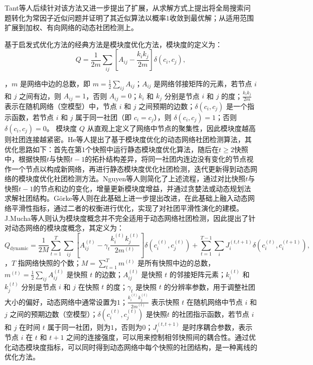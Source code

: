 Tant等人后续针对该方法又进一步提出了扩展，从求解方式上提出将全局搜索问题转化为常因子近似问题并证明了其近似算法以概率$1$收敛到最优解\cite{tantipathananandh2009constant}；从适用范围扩展到加权、有向网络的动态社团检测上\cite{tantipathananandh2011finding}。

基于启发式优化方法的经典方法是模块度优化方法，模块度\cite{newman2004finding}的定义为：
\begin{equation}
	Q = \frac{1}{2m} \sum_{ij} \left[ A_{ij} - \frac{k_i k_j}{2m} \right] \delta(c_i, c_j),
\end{equation}

，\( m \) 是网络中边的总数，即 \( m = \frac{1}{2} \sum_{ij} A_{ij} \)；\( A_{ij} \) 是网络邻接矩阵的元素，若节点 \( i \) 和 \( j \) 之间有边，则 \( A_{ij} = 1 \)，否则 \( A_{ij} = 0 \)；\( k_i \) 和 \( k_j \) 分别是节点 \( i \) 和 \( j \) 的度；\( \frac{k_i k_j}{2m} \) 表示在随机网络（空模型）中，节点 \( i \) 和 \( j \) 之间预期的边数；\( \delta(c_i, c_j) \) 是一个指示函数，若节点 \( i \) 和 \( j \) 属于同一社团（即 \( c_i = c_j \)），则 \( \delta(c_i, c_j) = 1 \)；否则 \( \delta(c_i, c_j) = 0 \)。
模块度 \( Q \) 从直观上定义了网络中节点的聚集性，因此模块度越高则社团连接越紧密。He等人\cite{he2015fast}提出了基于模块度优化的动态网络社团检测算法，其优化思路如下：首先在第\(1\)个快照中运行静态模块度优化算法，随后在$t \ge 2$快照中，根据快照$t$与快照$t-1$的拓扑结构差异，将同一社团内连边没有变化的节点视作一个节点以构成新网络，再进行静态模块度优化社团检测，迭代更新得到动态网络的模块度优化社团检测方法。Nguyen等人\cite{nguyen2011adaptive}则简化了上述流程，通过对比快照$t$与快照$t-1$的节点和边的变化，增量更新模块度增益，并通过贪婪法或动态规划法求解社团结构。G{\"o}rke等人\cite{gorke2013dynamic}则在此基础上进一步提出改进，在此基础上融入动态网络平滑性指标，通过二者的权衡进行优化，实现了对社团平滑性演化的建模。J.Mucha等人\cite{mucha2010community}则认为模块度概念并不完全适用于动态网络社团检测，因此提出了针对动态网络的模块度概念，其定义为：
\begin{equation}
	Q_{\text{dynamic}} = \frac{1}{2M} \sum_{t=1}^{T} \sum_{ij} \left[ A_{ij}^{(t)} - \gamma_t \frac{k_i^{(t)} k_j^{(t)}}{2m^{(t)}} \right] \delta(c_i^{(t)}, c_j^{(t)}) + \sum_{t=1}^{T-1} \sum_{i} J_{i}^{(t, t+1)} \delta(c_i^{(t)}, c_i^{(t+1)}),
\end{equation}
，\( T \) 指网络快照的个数；\( M = \sum_{t=1}^{T} m^{(t)} \) 是所有快照中边的总数，\( m^{(t)} = \frac{1}{2} \sum_{ij} A_{ij}^{(t)} \) 是快照 \( t \) 的边数；\( A_{ij}^{(t)} \) 是快照 \( t \) 的邻接矩阵元素；\( k_i^{(t)} \) 和 \( k_j^{(t)} \) 分别是节点 \( i \) 和 \( j \) 在快照 \( t \) 的度；\( \gamma_t \) 是快照 \( t \) 的分辨率参数，用于调整社团大小的偏好，动态网络中通常设置为$1$；\( \frac{k_i^{(t)} k_j^{(t)}}{2m^{(t)}} \) 表示快照 \( t \) 在随机网络中节点 \( i \) 和 \( j \) 之间的预期边数（空模型）；\( \delta(c_i^{(t)}, c_j^{(t)}) \) 是快照\( t \) 的社团指示函数，若节点 \( i \) 和 \( j \) 在时间 \( t \) 属于同一社团，则为$1$，否则为$0$；\( J_{i}^{(t, t+1)} \) 是时序耦合参数，表示节点 \( i \) 在 \( t \) 和 \( t+1 \) 之间的连接强度，可以用来控制相邻快照间的耦合性。通过优化动态模块度指标，可以同时得到动态网络中每个快照的社团结构，是一种离线的优化方法\cite{sarzynska2016null,10452807}。

